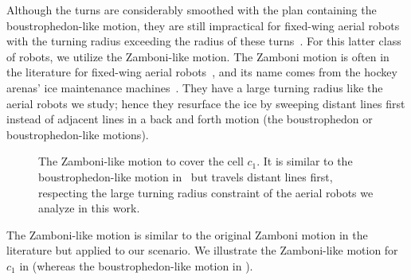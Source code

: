 Although the turns are considerably smoothed with the plan containing the boustrophedon-like motion, they are still impractical for fixed-wing aerial robots with the turning radius exceeding the radius of these turns~\citep{dille2013efficient,xu2011optimal,xu2014efficient}. For this latter class of robots, we utilize the Zamboni-like motion. The Zamboni motion is often in the literature for fixed-wing aerial robots~\citep{ablavsky2000optimal,araujo2013multiple,majeed2019new}, and its name comes from the hockey arenas' ice maintenance machines~\citep{araujo2013multiple,dille2013efficient,ablavsky2000optimal}. They have a large turning radius like the aerial robots we study; hence they resurface the ice by sweeping distant lines first instead of adjacent lines in a back and forth motion (the boustrophedon or boustrophedon-like motions). 
\begin{figure}[h]
  \centering
  \selectfont
  
  \caption[Zamboni-like motion covering a cell]{The Zamboni-like motion to cover the cell $c_1$. It is similar to the boustrophedon-like motion in~ but travels distant lines first, respecting the large turning radius constraint of the aerial robots we analyze in this work.}
  \label{fig:zambo1}
\end{figure}
The Zamboni-like motion is similar to the original Zamboni motion in the literature but applied to our scenario. We illustrate the Zamboni-like motion for $c_1$ in  (whereas the boustrophedon-like motion in ).

